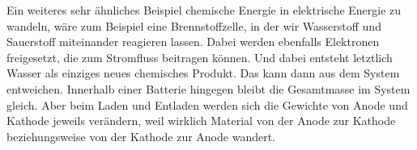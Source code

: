 \begin{frame}
{Ein weiteres sehr ähnliches Beispiel chemische Energie in elektrische Energie zu wandeln, wäre zum Beispiel eine Brennstoffzelle, in der wir Wasserstoff und Sauerstoff miteinander reagieren lassen. Dabei werden ebenfalls Elektronen freigesetzt, die zum Stromfluss beitragen können. Und dabei entsteht letztlich Wasser als einziges neues chemisches Produkt. Das kann dann aus dem System entweichen. Innerhalb einer Batterie hingegen bleibt die Gesamtmasse im System gleich. Aber beim Laden und Entladen werden sich die Gewichte von Anode und Kathode jeweils verändern, weil wirklich Material von der Anode zur Kathode beziehungsweise von der Kathode zur Anode wandert.
}

\end{frame}
